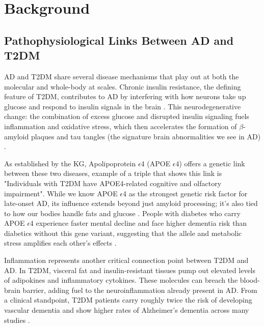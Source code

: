 \section{Background}
\subsection{Pathophysiological Links Between AD and T2DM}
AD and T2DM share several disease mechanisms that play out at both the molecular and whole-body at scales. Chronic insulin resistance, the defining feature of T2DM, contributes to AD by interfering with how neurons take up glucose and respond to insulin signals in the brain \cite{kciuk2024alzheimer}. This neurodegenerative change: the combination of excess glucose and disrupted insulin signaling fuels inflammation and oxidative stress, which then accelerates the formation of $\beta$-amyloid plaques and tau tangles (the signature brain abnormalities we see in AD) \cite{kciuk2024alzheimer}.

As established by the KG, Apolipoprotein $\epsilon$4 (APOE $\epsilon$4) offers a genetic link between these two diseases, example of a triple that shows this link is "Individuals with T2DM have APOE4-related cognitive and olfactory impairment". While we know APOE $\epsilon$4 as the strongest genetic risk factor for late-onset AD, its influence extends beyond just amyloid processing; it's also tied to how our bodies handle fats and glucose \cite{yassine2020apoe}. People with diabetes who carry APOE $\epsilon$4 experience faster mental decline and face higher dementia risk than diabetics without this gene variant, suggesting that the allele and metabolic stress amplifies each other's effects \cite{kciuk2024alzheimer, jabeen2022genetic}.

Inflammation represents another critical connection point between T2DM and AD. In T2DM, visceral fat and insulin-resistant tissues pump out elevated levels of adipokines and inflammatory cytokines. These molecules can breach the blood-brain barrier, adding fuel to the neuroinflammation already present in AD. From a clinical standpoint, T2DM patients carry roughly twice the risk of developing vascular dementia and show higher rates of Alzheimer's dementia across many studies \cite{kciuk2024alzheimer, exalto2012update}.


